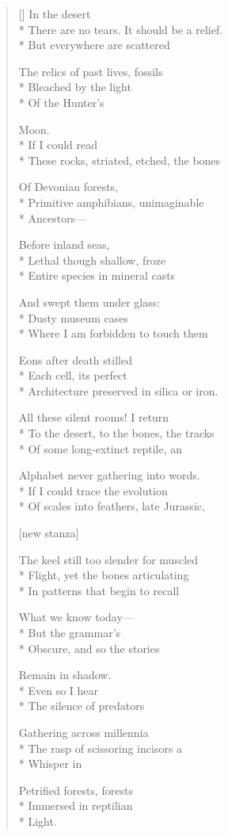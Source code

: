 \label{ch:petrified_forest}
\settowidth{\versewidth}{There are no tears. It should be a relief.}
\begin{verse}[\versewidth]
 \qquad  \qquad In the desert\\*
There are no tears. It should be a relief.\\*
But everywhere are scattered

The relics of past lives, fossils\\*
Bleached by the light\\*
Of the Hunter's

Moon.\\*
If I could read\\*
These rocks, striated, etched, the bones

Of Devonian forests,\\*
Primitive amphibians, unimaginable\\*
Ancestors---

 \qquad  \qquad Before inland seas,\\*
Lethal though shallow, froze\\*
Entire species in mineral casts

And swept them under glass:\\*
Dusty museum cases\\*
Where I am forbidden to touch them

Eons after death stilled\\*
Each cell, its perfect\\*
Architecture preserved in silica or iron.

All these silent rooms!  I return\\*
To the desert, to the bones, the tracks\\*
Of some long-extinct reptile, an

Alphabet never gathering into words.\\*
If I could trace the evolution\\*
Of scales into feathers, late Jurassic,





[new stanza]

The keel still too slender for muscled \\*
Flight, yet the bones articulating\\*
In patterns that begin to recall

What we know today---\\*
 \qquad  \qquad  \qquad But the grammar's\\*
Obscure, and so the stories

Remain in shadow.\\*
Even so I hear\\*
The silence of predators

Gathering across millennia\\*
The rasp of scissoring incisors a\\*
Whisper in 

Petrified forests, forests\\*
Immersed in reptilian\\*
Light.
\end{verse}
